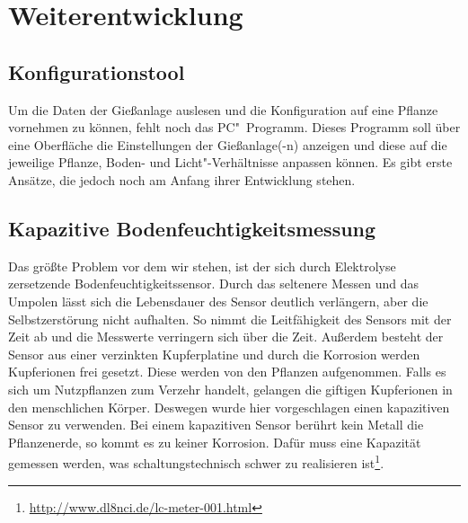 
\section{Weiterentwicklung}
\subsection{Konfigurationstool}
Um die Daten der Gießanlage auslesen und die Konfiguration auf eine Pflanze vornehmen zu können, fehlt noch das PC"~Programm. 
Dieses Programm soll über eine Oberfläche die Einstellungen der Gießanlage(-n) anzeigen und diese auf die jeweilige Pflanze, Boden- und Licht"-Verhältnisse anpassen können.
Es gibt erste Ansätze, die jedoch noch am Anfang ihrer Entwicklung stehen.

\subsection{Kapazitive Bodenfeuchtigkeitsmessung}
Das größte Problem vor dem wir stehen, ist der sich durch Elektrolyse zersetzende Bodenfeuchtigkeitssensor.
Durch das seltenere Messen und das Umpolen lässt sich die Lebensdauer des Sensor deutlich verlängern, aber die Selbstzerstörung nicht aufhalten.
So nimmt die Leitfähigkeit des Sensors mit der Zeit ab und die Messwerte verringern sich über die Zeit.
Außerdem besteht der Sensor aus einer verzinkten Kupferplatine und durch die Korrosion werden Kupferionen frei gesetzt. 
Diese werden von den Pflanzen aufgenommen. Falls es sich um Nutzpflanzen zum Verzehr handelt, gelangen die giftigen Kupferionen in den menschlichen Körper.
Deswegen wurde hier vorgeschlagen einen kapazitiven Sensor zu verwenden. 
Bei einem kapazitiven Sensor berührt kein Metall die Pflanzenerde, so kommt es zu keiner Korrosion.
Dafür muss eine Kapazität gemessen werden, was schaltungstechnisch schwer zu realisieren ist\footnote{\href{http://www.dl8nci.de/lc-meter-001.html}{http://www.dl8nci.de/lc-meter-001.html}}.
 